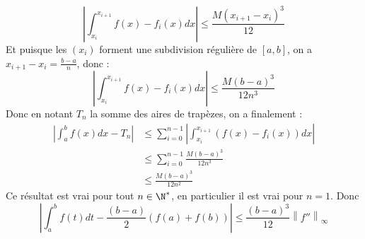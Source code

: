 \documentclass{book}
\begin{document}
	 \[\left|\int_{x_i}^{x_{i+1}}f(x)-f_i(x) dx\right|\leq \frac{M(x_{i+1}-x_i)^3}{12}\]
	 Et puisque les $(x_i)$ forment une subdivision régulière de $[a,b]$, on a $x_{i+1}-x_i=\frac{b-a}{n}$, donc :  \[\left|\int_{x_i}^{x_{i+1}}f(x)-f_i(x) dx\right|\leq \frac{M(b-a)^3}{12n^3}\]
	Donc en notant $T_n$ la somme des aires de trapèzes, on a finalement :
	\begin{align*}
		\left|\int_{a}^{b}f(x)dx-T_n\right|&\leq\sum_{i=0}^{n-1}\left|\int_{x_i}^{x_{i+1}}\left(f(x)-f_i(x)\right)dx\right|\\
		&\leq\sum_{i=0}^{n-1}\frac{M(b-a)^3}{12n^3}\\
		&\leq \frac{M(b-a)^3}{12n^2}
	\end{align*} 
	Ce résultat est vrai pour tout $n\in\N^*$, en particulier il est vrai pour $n=1$.
	Donc \[\left| \int_a^b f(t)dt-\frac{(b-a)}{2}(f(a)+f(b))\right| \leq \frac{(b-a)^3}{12}\left\|f''\right\|_\infty\]
	
\end{document}
